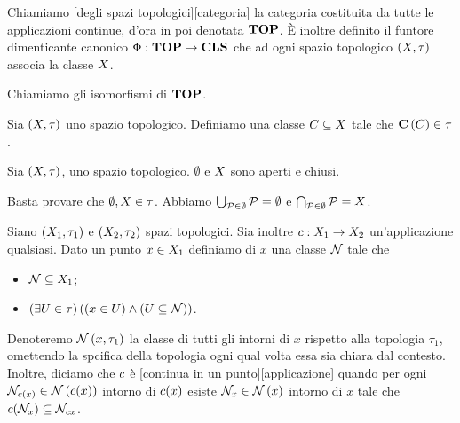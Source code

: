 \begin{Definition}
	Chiamiamo [degli spazi topologici][categoria]
	la categoria costituita da tutte le applicazioni continue, d'ora
	in poi denotata $\mathbf{TOP}$. \`E inoltre definito il
	funtore dimenticante canonico $\Phi: \mathbf{TOP}
	\rightarrow \mathbf{CLS}$ che ad ogni spazio topologico
	$(X,\tau)$ associa la classe
	$X$. 
\end{Definition}
\begin{Definition}
	Chiamiamo  gli isomorfismi di
	$\mathbf{TOP}$.
\end{Definition}
\begin{Definition}
	Sia $(X,\tau)$ uno spazio topologico.
	Definiamo  una classe $C \subseteq
	X$ tale che $\mathbf{C} \left ( C \right ) \in \tau$.
\end{Definition}
\begin{Theorem}
	Sia $(X,\tau)$, uno spazio topologico.
	$\emptyset$ e $X$ sono aperti e chiusi.
\end{Theorem}
\Proof Basta provare che $\emptyset, X \in \tau$.
Abbiamo $\bigcup_{\mathcal{P} \in \emptyset} \mathcal{P} = \emptyset$ e
$\bigcap_{\mathcal{P} \in \emptyset} \mathcal{P} = X$. \EndProof
\begin{Definition}
	Siano $(X_1,\tau_1)$ e
	$(X_2,\tau_2)$ spazi topologici. Sia inoltre
	$c: X_1 \rightarrow X_2$
	un'applicazione qualsiasi.
	Dato un punto $x \in X_1$ definiamo
	 di $x$ una classe $\mathcal{N}$ tale che
	\begin{itemize}
		\item $\mathcal{N} \subseteq X_1$;
		\item $\left ( \exists U \in \tau \right ) \left ( \left ( x \in U \right ) \wedge \left ( U \subseteq
		\mathcal{N} \right ) \right )$.
	\end{itemize}
	Denoteremo $\Neighborhoods{x}[\Topology_1]$ la classe di tutti gli intorni di $x$ rispetto alla topologia $\tau_1$, omettendo la spcifica della topologia ogni qual volta essa sia chiara dal contesto.
	Inoltre, diciamo che $c$ \`e
	[continua in un punto][applicazione] quando
	per ogni $\Neighborhood_{\Continuous(x)} \in \Neighborhoods{\Continuous(x)}$ intorno di
	$c(x)$ esiste $\Neighborhood_x \in \Neighborhoods{x}$ intorno di $x$ tale che
	$c(\mathcal{N}_x) \subseteq \mathcal{N}_{c{x}}$.
\end{Definition}
